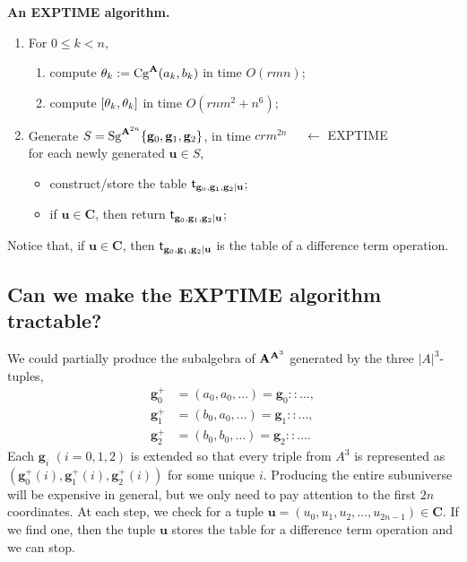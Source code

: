     \noindent \textbf{An {\small EXPTIME} algorithm.}
     \begin{enumerate}
       \item For $0\leq k < n$,
       \begin{enumerate}
         \item compute $\theta_k:= \operatorname{Cg}^{\mathbf{A}}(a_k, b_k)$ in time $O(rmn)$;
         \item compute $[ \theta_k ,  \theta_k ]$ in time $O(rnm^2 + n^6)$;
       \end{enumerate}
    \item Generate $S=\operatorname{Sg}^{\mathbf{A}^{2n}} \{\mathbf{g}_0, \mathbf{g}_1, \mathbf{g}_2\}$,
      in time $c r m^{2n}$ {\tiny {\color{red} $\quad \leftarrow$ EXPTIME}}\\
    for each newly generated $\mathbf{u} \in S$, 
      \begin{itemize}
      \item construct/store the table
        $\mathsf{t}_{\mathbf{g}_0, \mathbf{g}_1, \mathbf{g}_2|\mathbf{u}}$;
      \item if $\mathbf{u} \in \mathbf{C}$, then return     $\mathsf{t}_{\mathbf{g}_0, \mathbf{g}_1, \mathbf{g}_2|\mathbf{u}}$;
      \end{itemize}
    \end{enumerate}
    Notice that, if $\mathbf{u} \in \mathbf{C}$, then $\mathsf{t}_{\mathbf{g}_0, \mathbf{g}_1, \mathbf{g}_2|\mathbf{u}}$  is the table of a difference term operation.
    
    \subsection{Can we make the {\small EXPTIME} algorithm tractable?}
    We could partially produce the subalgebra of $\mathbf{A}^{\mathbf{A}^3}$ generated by
    the three $|A|^3$-tuples,
    \begin{align*}
    \mathbf{g}^+_0 &= (a_0, a_0, \dots) = \mathbf{g}_0 :: \dots,\\
    \mathbf{g}^+_1 &= (b_0, a_0, \dots) = \mathbf{g}_1 :: \dots,\\
    \mathbf{g}^+_2 &= (b_0, b_0, \dots) = \mathbf{g}_2 :: \dots.
    \end{align*}
    Each $\mathbf{g}_i$ $(i=0,1,2)$ is extended so that every 
    triple from $A^3$ is represented as $(\mathbf{g}^+_0(i), \mathbf{g}^+_1(i), \mathbf{g}^+_2(i))$ for some 
    unique $i$.  Producing the entire subuniverse will be expensive in 
    general, but we only need to pay attention to the first $2n$ coordinates. 
    At each step, we check for a tuple $\mathbf{u} = (u_0, u_1, u_2, \dots, u_{2n-1})\in \mathbf{C}$.  
    If we find one, then the tuple $\mathbf{u}$ stores
    the table for a difference term operation and we can stop.
    
